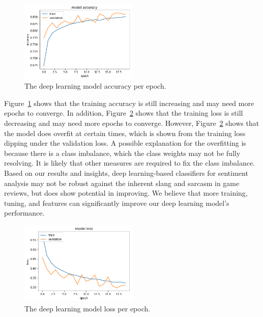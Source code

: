 \documentclass[conference]{IEEEtran}
\begin{document}
\begin{figure}[!t]
\center
    \includegraphics[width=0.5\textwidth]{img/results/model_acc5.png}
  \caption{The deep learning model accuracy per epoch.}
  \label{fig:model_accuracy}
\end{figure}



Figure~\ref{fig:model_accuracy} shows that the training accuracy is still increasing and may need more epochs to converge. In addition, Figure~\ref{fig:model_loss} shows that the training loss is still decreasing and may need more epochs to converge. However, Figure~\ref{fig:model_loss} shows that the model does overfit at certain times, which is shown from the training loss dipping under the validation loss. A possible explanation for the overfitting is because there is a class imbalance, which the class weights may not be fully resolving. It is likely that other measures are required to fix the class imbalance. Based on our results and insights, deep learning-based classifiers for sentiment analysis may not be robust against the inherent slang and sarcasm in game reviews, but does show potential in improving. We believe that more training, tuning, and features can significantly improve our deep learning model's performance.

\begin{figure}[!t]
\center
    \includegraphics[width=0.5\textwidth]{img/results/model_loss5.png}
  \caption{The deep learning model loss per epoch.}
  \label{fig:model_loss}
\end{figure}
\end{document}

